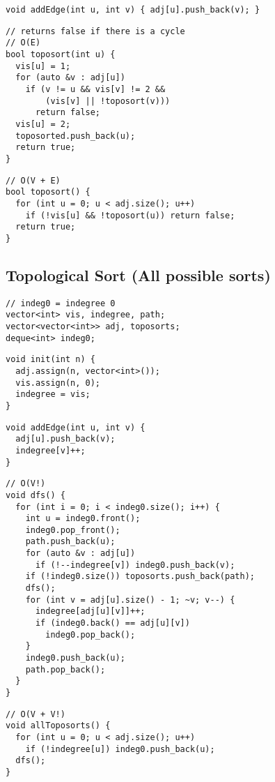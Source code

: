 \documentclass[twoside]{article}
\newcommand{\fileTitleStyle}{\large\underline}
\begin{document}
\begin{multicols*}{2}
\begin{verbatim}
void addEdge(int u, int v) { adj[u].push_back(v); }
\end{verbatim}
\vspace{-12pt}
\begin{verbatim}
// returns false if there is a cycle
// O(E)
bool toposort(int u) {
  vis[u] = 1;
  for (auto &v : adj[u])
    if (v != u && vis[v] != 2 &&
        (vis[v] || !toposort(v)))
      return false;
  vis[u] = 2;
  toposorted.push_back(u);
  return true;
}
\end{verbatim}
\vspace{-12pt}
\begin{verbatim}
// O(V + E)
bool toposort() {
  for (int u = 0; u < adj.size(); u++)
    if (!vis[u] && !toposort(u)) return false;
  return true;
}
\end{verbatim}

\subsectionfont{\centering\bfseries\LARGE}
\subsectionfont{\fileTitleStyle}
\subsection*{Topological Sort (All possible sorts)}
\begin{verbatim}
// indeg0 = indegree 0
vector<int> vis, indegree, path;
vector<vector<int>> adj, toposorts;
deque<int> indeg0;
\end{verbatim}
\vspace{-12pt}
\begin{verbatim}
void init(int n) {
  adj.assign(n, vector<int>());
  vis.assign(n, 0);
  indegree = vis;
}
\end{verbatim}
\vspace{-12pt}
\begin{verbatim}
void addEdge(int u, int v) {
  adj[u].push_back(v);
  indegree[v]++;
}
\end{verbatim}
\vspace{-12pt}
\begin{verbatim}
// O(V!)
void dfs() {
  for (int i = 0; i < indeg0.size(); i++) {
    int u = indeg0.front();
    indeg0.pop_front();
    path.push_back(u);
    for (auto &v : adj[u])
      if (!--indegree[v]) indeg0.push_back(v);
    if (!indeg0.size()) toposorts.push_back(path);
    dfs();
    for (int v = adj[u].size() - 1; ~v; v--) {
      indegree[adj[u][v]]++;
      if (indeg0.back() == adj[u][v])
        indeg0.pop_back();
    }
    indeg0.push_back(u);
    path.pop_back();
  }
}
\end{verbatim}
\vspace{-12pt}
\begin{verbatim}
// O(V + V!)
void allToposorts() {
  for (int u = 0; u < adj.size(); u++)
    if (!indegree[u]) indeg0.push_back(u);
  dfs();
}
\end{verbatim}


\end{multicols*}
\end{document}
